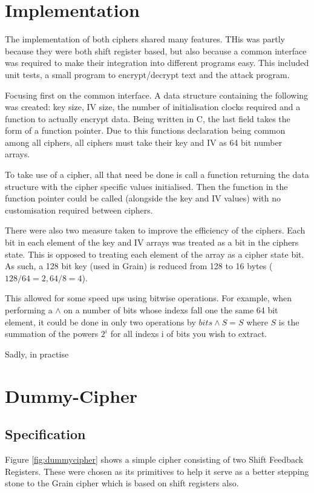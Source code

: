 \documentclass{report}
\begin{document}
\section{Implementation}
The implementation of both ciphers shared many features. THis was partly because they were both shift register based, but also because a common interface was required to make their integration into different programs easy. This included unit tests, a small program to encrypt/decrypt text and the attack program.

Focusing first on the common interface. A data structure containing the following was created: key size, IV size, the number of initialisation clocks required and a function to actually encrypt data. Being written in C, the last field takes the form of a function pointer. Due to this functions declaration being common among all ciphers, all ciphers must take their key and IV as 64 bit number arrays.

To take use of a cipher, all that need be done is call a function returning the data structure with the cipher specific values initialised. Then the function in the function pointer could be called (alongside the key and IV values) with no customisation required between ciphers.

There were also two measure taken to improve the efficiency of the ciphers. Each bit in each element of the key and IV arrays was treated as a bit in the ciphers state. This is opposed to treating each element of the array as a cipher state bit. As such, a 128 bit key (used in Grain) is reduced from 128 to 16 bytes ($128/64 = 2, 64/8=4$).

This allowed for some speed ups using bitwise operations. For example, when performing a $\land$ on a number of bits whose indexs fall one the same 64 bit element, it could be done in only two operations by $bits \land S = S$ where $S$ is the summation of the powers $2^i$ for all indexs i of bits you wish to extract.

Sadly, in practise %

\section{Dummy-Cipher}
\subsection{Specification}
Figure \ref{fig:dummycipher} shows a simple cipher consisting of two Shift Feedback Registers. These were chosen as its primitives to help it serve as a better stepping stone to the Grain cipher which is based on shift registers also.
\end{document}
